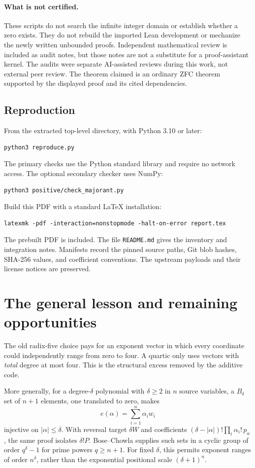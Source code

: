 \documentclass[11pt,letterpaper]{article}
\theoremstyle{remark}
\begin{document}
\paragraph{What is not certified.}
These scripts do not search the infinite integer domain or establish
whether a zero exists. They do not rebuild the imported Lean
development or mechanize the newly written unbounded proofs.
Independent mathematical review is included as audit notes, but
those notes are not a substitute for a proof-assistant kernel.
The audits were separate AI-assisted reviews during this work, not
external peer review.
The theorem claimed is an ordinary ZFC theorem supported by the
displayed proof and its cited dependencies.

\subsection{Reproduction}

From the extracted top-level directory, with Python 3.10 or later:
\begin{lstlisting}
python3 reproduce.py
\end{lstlisting}
The primary checks use the Python standard library and require no
network access. The optional secondary checker uses NumPy:
\begin{lstlisting}
python3 positive/check_majorant.py
\end{lstlisting}
Build this PDF with a standard LaTeX installation:
\begin{lstlisting}
latexmk -pdf -interaction=nonstopmode -halt-on-error report.tex
\end{lstlisting}
The prebuilt PDF is included. The file \texttt{README.md} gives the
inventory and integration notes. Manifests record the pinned source
paths, Git blob hashes, SHA-256 values, and coefficient conventions.
The upstream payloads and their license notices are preserved.

\section{The general lesson and remaining opportunities}

The old radix-five choice pays for an exponent vector in which every
coordinate could independently range from zero to four. A quartic
only uses vectors with \emph{total} degree at most four. This is the
structural excess removed by the additive code.

More generally, for a degree-\(\delta\) polynomial with \(\delta\ge2\) in \(n\) source
variables, a \(B_\delta\) set of \(n+1\) elements, one translated to
zero, makes
\[
e(\alpha)=\sum_{i=1}^n\alpha_iw_i
\]
injective on \(|\alpha|\le\delta\). With reversal target \(\delta W\)
and coefficients
\((\delta-|\alpha|)!\prod_i\alpha_i!\,p_\alpha\), the same proof
isolates \(\delta!P\). Bose--Chowla supplies such sets in a cyclic
group of order \(q^\delta-1\) for prime powers \(q\ge n+1\).
For fixed \(\delta\), this permits exponent ranges of order
\(n^\delta\), rather than the exponential positional scale
\((\delta+1)^n\).
\end{document}
